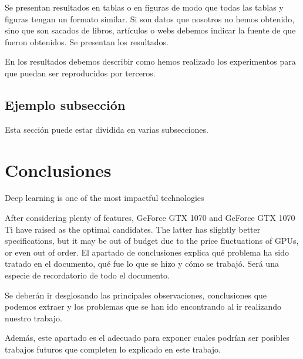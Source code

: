 \documentclass[a4paper,twocolumn]{article}
\begin{document}
\begin{itemize}
Se presentan resultados en tablas o en figuras de modo que todas las tablas y figuras tengan un formato similar. Si son datos que nosotros no hemos obtenido, sino que son sacados de libros, artículos o webs debemos indicar la fuente de que fueron obtenidos. Se presentan los resultados.

En los resultados debemos describir como hemos realizado los experimentos para que puedan ser reproducidos por terceros.

\subsection{Ejemplo subsección}
Esta sección puede estar dividida en varias subsecciones.



\section{Conclusiones}

Deep learning is one of the most impactful technologies

After considering plenty of features, GeForce GTX 1070 and GeForce GTX 1070 Ti have raised as the optimal candidates. The latter has slightly better specifications, but it may be out of budget due to the price fluctuations of GPUs, or even out of order.
El apartado de conclusiones explica qué problema ha sido tratado en el documento, qué fue lo que se hizo y cómo se trabajó. Será una especie de recordatorio de todo el documento.

Se deberán ir desglosando las principales observaciones, conclusiones que podemos extraer y los problemas que se han ido encontrando al ir realizando nuestro trabajo.

Además, este apartado es el adecuado para exponer cuales podrían ser posibles trabajos futuros que completen lo explicado en este trabajo.




\begin{thebibliography}{99} %


\end{thebibliography}
\end{itemize}
\end{document}
